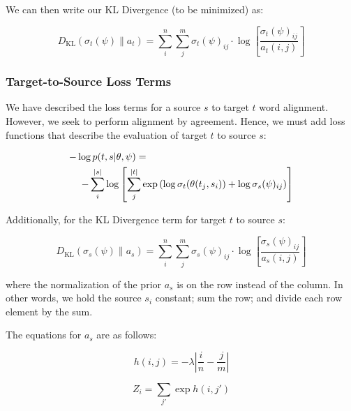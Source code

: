 \documentclass[twoside,twocolumn]{article}
\begin{document}
We can then write our KL Divergence (to be minimized) as:

\begin{equation}
  D_{\mathrm{KL}}(\sigma_t(\psi) \| a_t) =
    \sum_i^n \sum_j^m \sigma_t(\psi)_{ij} \cdot
      \log \left[ \frac{\sigma_t(\psi)_{ij}}{a_t(i, j)} \right]
\end{equation}


\subsubsection{Target-to-Source Loss Terms}

We have described the loss terms for a source $s$ to target $t$ word alignment.
However, we seek to perform alignment by agreement. Hence, we must add loss
functions that describe the evaluation of target $t$ to source $s$:

\begin{equation}
  \centering
  \begin{split}
  -\log  p(t & , s | \theta, \psi) = \\
  - \sum_i^{|s|} & \log \left[ \sum_j^{|t|}
      \exp \left(
        \log \sigma_t(\theta(t_j, s_i)) + \log \sigma_s(\psi)_{ij}
      \right)
    \right]
\end{split}
\end{equation}

\noindent
Additionally, for the KL Divergence term for target $t$ to source $s$:

\begin{equation}
D_{\mathrm{KL}} (\sigma_s(\psi) \| a_s) = \sum_i^n \sum_j^m \sigma_s(\psi)_{ij}
  \cdot \log \left[ \frac{\sigma_s(\psi)_{ij}}{a_s(i, j)} \right]
\end{equation}

\noindent
where the normalization of the prior $a_s$ is on the row instead of the column.
In other words, we hold the source $s_i$ constant; sum the row; and divide each
row element by the sum.

The equations for $a_s$ are as follows:

\begin{equation}
  h(i, j) = {-\lambda \left| \frac{i}{n} - \frac{j}{m}\right|}
\end{equation}

\begin{equation}
  Z_i = \sum_{j'} \exp h(i, j')
\end{equation}
\end{document}
